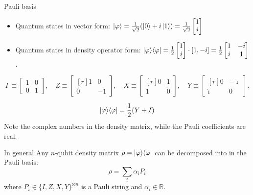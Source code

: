 \begin{frame}{Pauli basis}
        \begin{itemize}
                \item Quantum states in vector form: $\ket{\varphi} = \frac{1}{\sqrt{2}}(\ket{0} + \dot{\imath} \ket{1}) 
                = \frac{1}{\sqrt{2}} \begin{bmatrix}
                        1 \\
                        \dot{\imath}
                \end{bmatrix}$
                \item Quantum states in density operator form: 
                $| \varphi \rangle \langle \varphi | = \frac{1}{2} \begin{bmatrix} 1 \\ \dot{\imath} \end{bmatrix}\cdot [1, -\dot{\imath}] = 
                \frac{1}{2}
                \begin{bmatrix}
                        1 & -\dot{\imath} \\
                        \dot{\imath} & 1
                \end{bmatrix}
                $.
        \end{itemize}

        \pause
        \[
   I\, \equiv
    \begin{bmatrix}
      1 & 0 \\
      0 & 1
    \end{bmatrix},
    \quad
    Z \equiv
    \begin{bmatrix*}[r]
      1 & 0 \\
      0 & -1
    \end{bmatrix*},
    \quad
    X \equiv
    \begin{bmatrix*}[r]
      0 & 1 \\
      1 & 0
    \end{bmatrix*},
    \quad
     Y \equiv
    \begin{bmatrix*}[r]
      0 & -\dot{\imath} \\
      \dot{\imath} & 0
    \end{bmatrix*}
.
\]
\pause

\[
        | \varphi \rangle \langle \varphi | = \frac{1}{2}(Y+I)
\]
        Note the complex numbers in the density matrix, while the Pauli coefficients are real.

\pause
\begin{block}{In general}
    Any $n$-qubit density matrix $\rho = | \varphi \rangle \langle \varphi |$  can be decomposed into in the Pauli basis:
    \[
       \rho = \sum_i \alpha_i P_i
    \]
    where $P_i\in\{I,Z,X,Y\}^{\otimes n}$ is a Pauli string and $\alpha_i\in\mathbb{R}$.
\end{block}

\end{frame}



